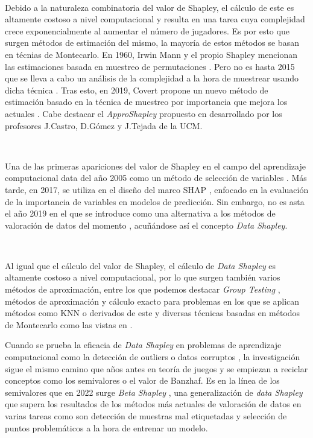 \

Debido a la naturaleza combinatoria del valor de Shapley, el cálculo
de este es altamente costoso a nivel computacional y resulta en una
tarea cuya complejidad crece exponencialmente al aumentar el
número de jugadores. Es por esto que surgen métodos de estimación del
mismo, la mayoría de estos métodos se basan en técnias de Montecarlo.
En 1960, Irwin Mann y el propio Shapley mencionan las estimaciones
basada en muestreo de permutaciones \cite{permutationSampling}. Pero
no es hasta 2015 que se lleva a cabo un análisis de la complejidad
a la hora de muestrear usando dicha técnica \cite{maleki}.
Tras esto, en 2019, Covert propone un nuevo método de estimación basado
en la técnica de muestreo por importancia que mejora los actuales
\cite{covert}. Cabe destacar el \textit{ApproShapley} propuesto en
{\cite{Tejada}}  desarrollado por los profesores J.Castro,
D.Gómez y J.Tejada de la UCM.

\

Una de las primeras apariciones del valor de Shapley en el campo
del aprendizaje computacional data del año 2005 como un método de
selección de variables \cite{featureSelection}. Más tarde, en
2017, se utiliza en el diseño del marco SHAP \cite{featureImportance},
enfocado en la evaluación de la importancia de variables en modelos de
predicción. Sin embargo, no es asta el año 2019 en el que se introduce
como una alternativa a los métodos de valoración de datos del
momento \cite{dataShapley}, acuñándose así el concepto 
\textit{Data Shapley}.

\

Al igual que el cálculo del valor de Shapley, el cálculo de
\textit{Data Shapley} es altamente costoso a nivel computacional,
por lo que surgen también varios métodos de aproximación, entre
los que podemos destacar \textit{Group Testing} \cite{looFuck},
métodos de aproximación y cálculo exacto para problemas en los
que se aplican métodos como KNN o derivados de este \cite{knn} y
diversas técnicas basadas en métodos de Montecarlo como las vistas
en \cite{dataShapley}.

Cuando se prueba la eficacia de \textit{Data Shapley} en problemas de
aprendizaje computacional como la detección de outliers o datos corruptos
{\cite{dataShapley}}, la investigación sigue el mismo camino que años
antes en teoría de juegos y se empiezan a reciclar conceptos como los
semivalores o el valor de Banzhaf. Es en la línea de los semivalores que
en 2022 surge \textit{Beta Shapley} {\cite{betaShapley}}, una
generalización de \textit{data Shapley} que supera los
resultados de los métodos más actuales de valoración de datos
en varias tareas como son detección de muestras mal etiquetadas
y selección de puntos problemáticos a la hora de entrenar un modelo.

